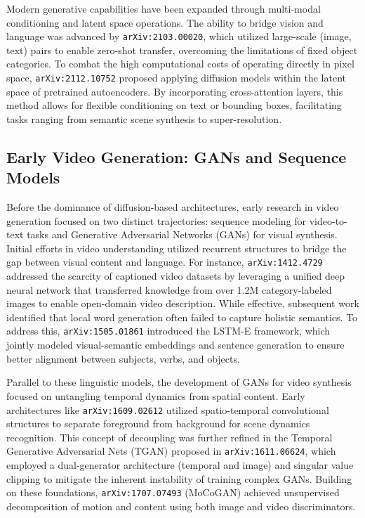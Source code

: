 \documentclass[11pt]{article}
\begin{document}
Modern generative capabilities have been expanded through multi-modal conditioning and latent space operations. The ability to bridge vision and language was advanced by \texttt{arXiv:2103.00020}, which utilized large-scale (image, text) pairs to enable zero-shot transfer, overcoming the limitations of fixed object categories. To combat the high computational costs of operating directly in pixel space, \texttt{arXiv:2112.10752} proposed applying diffusion models within the latent space of pretrained autoencoders. By incorporating cross-attention layers, this method allows for flexible conditioning on text or bounding boxes, facilitating tasks ranging from semantic scene synthesis to super-resolution.

\subsection{Early Video Generation: GANs and Sequence Models}

Before the dominance of diffusion-based architectures, early research in video generation focused on two distinct trajectories: sequence modeling for video-to-text tasks and Generative Adversarial Networks (GANs) for visual synthesis. Initial efforts in video understanding utilized recurrent structures to bridge the gap between visual content and language. For instance, \texttt{arXiv:1412.4729} addressed the scarcity of captioned video datasets by leveraging a unified deep neural network that transferred knowledge from over 1.2M category-labeled images to enable open-domain video description. While effective, subsequent work identified that local word generation often failed to capture holistic semantics. To address this, \texttt{arXiv:1505.01861} introduced the LSTM-E framework, which jointly modeled visual-semantic embeddings and sentence generation to ensure better alignment between subjects, verbs, and objects.

Parallel to these linguistic models, the development of GANs for video synthesis focused on untangling temporal dynamics from spatial content. Early architectures like \texttt{arXiv:1609.02612} utilized spatio-temporal convolutional structures to separate foreground from background for scene dynamics recognition. This concept of decoupling was further refined in the Temporal Generative Adversarial Nets (TGAN) proposed in \texttt{arXiv:1611.06624}, which employed a dual-generator architecture (temporal and image) and singular value clipping to mitigate the inherent instability of training complex GANs. Building on these foundations, \texttt{arXiv:1707.07493} (MoCoGAN) achieved unsupervised decomposition of motion and content using both image and video discriminators.
\end{document}
